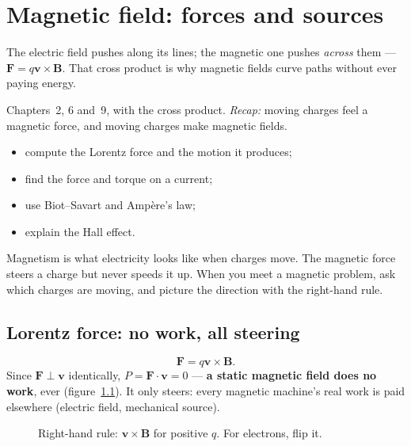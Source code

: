 \chapter{Magnetic field: forces and sources}\label{ch:mag}

The electric field pushes along its lines; the magnetic one pushes
\emph{across} them --- $\mathbf F=q\mathbf v\times\mathbf B$. That cross
product is why magnetic fields curve paths without ever paying energy.

\begin{rulebox}
Chapters~2, 6 and~9, with the cross product. \emph{Recap:} moving charges feel a magnetic force, and moving charges make magnetic fields.
\end{rulebox}
\begin{wins}
\begin{itemize}
\item compute the Lorentz force and the motion it produces;
\item find the force and torque on a current;
\item use Biot--Savart and Amp\`ere's law;
\item explain the Hall effect.
\end{itemize}
\end{wins}
\begin{principle}
Magnetism is what electricity looks like when charges move. The magnetic force steers a charge but never speeds it up. When you meet a magnetic problem, ask which charges are moving, and picture the direction with the right-hand rule.
\end{principle}

\section{Lorentz force: no work, all steering}\label{sec:mag-lor}

\begin{equation}
  \mathbf F=q\mathbf v\times\mathbf B.\label{eq:lor}
\end{equation}
Since $\mathbf F\perp\mathbf v$ identically, $P=\mathbf F\cdot\mathbf v=0$
--- \textbf{a static magnetic field does no work}, ever
(figure~\ref{fig:rh}). It only steers: every magnetic machine's real
work is paid elsewhere (electric field, mechanical source).

\begin{figure}[htbp]\centering

\caption{Right-hand rule: $\mathbf v\times\mathbf B$ for positive $q$.
For electrons, flip it.}
\label{fig:rh}
\end{figure}

